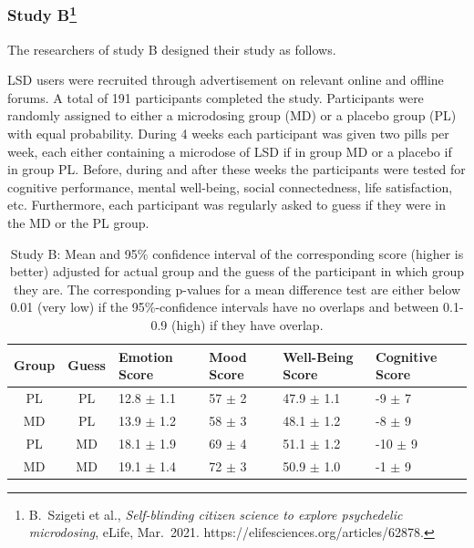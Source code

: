 \subsubsection*{Study B\footnote{B.\ Szigeti et al., \textit{Self-blinding citizen science to explore psychedelic microdosing}, eLife, Mar.\ 2021. https://elifesciences.org/articles/62878.}}

The researchers of study B designed their study as follows.

LSD users were recruited through advertisement on relevant online and offline forums. 
A total of 191 participants completed the study.
Participants were randomly assigned to either a microdosing group (MD) or a placebo group (PL) with equal probability.
During 4 weeks each participant was given two pills per week, each either containing a microdose of LSD if in group MD or a
placebo if in group PL. 
Before, during and after these weeks the participants were tested for cognitive performance, mental well-being,
social connectedness, life satisfaction, etc.
Furthermore, each participant was regularly asked to guess if they were in the MD or the PL group.

\begin{table}[h!] %
\caption{Study B: Mean and 95\% confidence interval of the corresponding score (higher is better) 
    adjusted for actual group and the guess of the participant in which group they are. 
    The corresponding p-values for a mean difference test are either below 0.01 (very low) if the 
  95\%-confidence intervals have no overlaps and between 0.1-0.9 (high) if they have overlap.\label{tab:study-B}}
\begin{center}
\begin{tabular}{ c|c|l|l|l|l}
    Group & Guess  & Emotion Score & Mood Score & Well-Being Score & Cognitive Score \\
 \hline
    PL & PL & 12.8 $\pm$ 1.1 & 57 $\pm$ 2& 47.9 $\pm$ 1.1 & -9 $\pm$ 7\\
    MD & PL & 13.9 $\pm$ 1.2 & 58 $\pm$ 3& 48.1 $\pm$ 1.2 & -8 $\pm$ 9\\
    PL & MD &  18.1 $\pm$ 1.9& 69 $\pm$ 4& 51.1 $\pm$ 1.2 & -10 $\pm$ 9\\
    MD & MD &   19.1 $\pm$ 1.4&72 $\pm$ 3& 50.9 $\pm$ 1.0 & -1 $\pm$ 9
\end{tabular}
\end{center}
\end{table}

